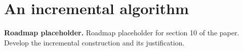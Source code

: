 \chapter{An incremental algorithm}

\noindent\textbf{Roadmap placeholder.}
Roadmap placeholder for section 10 of the paper. Develop the incremental
construction and its justification.
